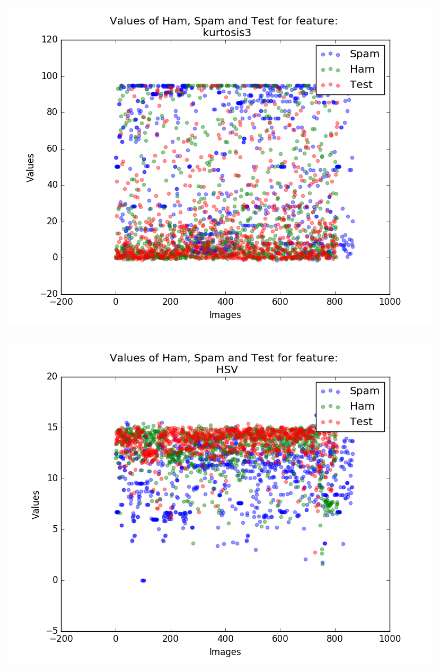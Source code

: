 \begin{figure}[h]
	\centering
	\begin{minipage}{.5\textwidth}
		\centering
		\includegraphics[width=\linewidth]{images/appA/kurtosis3_values_scatter}
		\label{fig:kurtosis3_values_scatter}
	\end{minipage}%
	\begin{minipage}{.5\textwidth}
		\centering
		\includegraphics[width=\linewidth]{images/appA/HSV_values_scatter}
		\label{fig:hsv_values_scatter}
	\end{minipage}
\end{figure}


